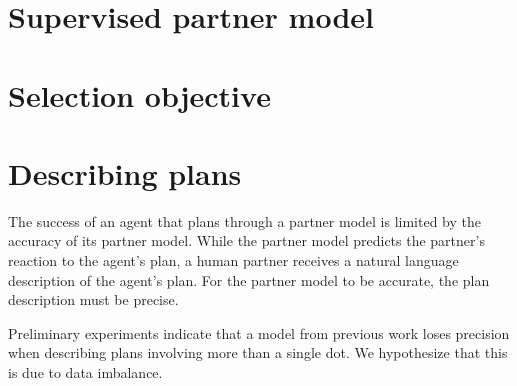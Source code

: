 \documentclass[11pt]{article}
\begin{document}
\section{Supervised partner model}


\section{Selection objective}

\section{Describing plans}
The success of an agent that plans through a partner model is limited
by the accuracy of its partner model.
While the partner model predicts the partner's reaction to the agent's plan,
a human partner receives a natural language description of the agent's plan.
For the partner model to be accurate, the plan description must be precise.

Preliminary experiments indicate that a model from previous work \citep{fried}
loses precision when describing plans involving more than a single dot.
We hypothesize that this is due to data imbalance.
\end{document}
